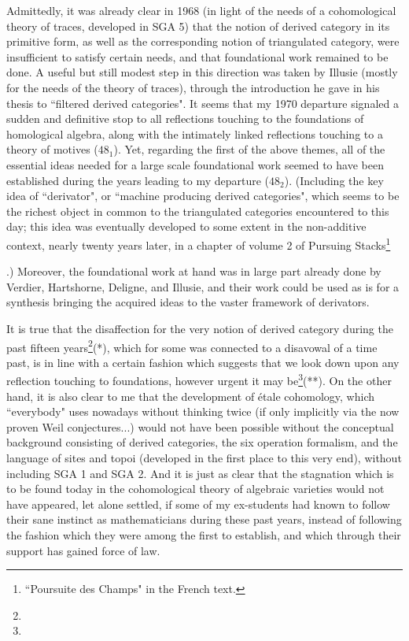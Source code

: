 Admittedly, it was already clear in 1968 (in light of the needs of a cohomological theory of traces, developed in SGA 5) that the notion of derived category in its primitive form, as well as the corresponding notion of triangulated category, were insufficient to satisfy certain needs, and that foundational work remained to be done. A useful but still modest step in this direction was taken by Illusie (mostly for the needs of the theory of traces), through the introduction he gave in his thesis to ``filtered derived categories". It seems that my 1970 departure signaled a sudden and definitive stop to all reflections touching to the foundations of homological algebra, along with the intimately linked reflections touching to a theory of motives ($48_1$).
Yet, regarding the first of the above themes, all of the essential ideas needed for a large scale foundational work seemed to have been established during the years leading to my departure ($48_2$).
(Including the key idea of ``derivator", or ``machine producing derived categories", which seems to be the richest object in common to the triangulated categories encountered to this day; this idea was eventually developed to some extent in the non-additive context, nearly twenty years later, in a chapter of volume 2 of Pursuing Stacks\footnote{``Poursuite des Champs" in the French text.}
\addtocounter{footnote}{-1}.) 
Moreover, the foundational work at hand was in large part already done by Verdier, Hartshorne, Deligne, and Illusie, and their work could be used as is for a synthesis bringing the acquired ideas to the vaster framework of derivators.

It is true that the disaffection for the very notion of derived category during the past fifteen years\footnote{}(*), which for some was connected to a disavowal of a time past, is in line with a certain fashion which suggests that we look down upon any reflection touching to foundations, however urgent it may be\footnote{}(**). On the other hand, it is also clear to me that the development of \'etale cohomology, which ``everybody" uses nowadays without thinking twice (if only implicitly via the now proven Weil conjectures...) would not have been possible without the conceptual background consisting of derived categories, the six operation formalism, and the language of sites and topoi (developed in the first place to this very end), without including SGA 1 and SGA 2. And it is just as clear that the stagnation which is to be found today in the cohomological theory of algebraic varieties would not have appeared, let alone settled, if some of my ex-students had known to follow their sane instinct as mathematicians during these past years, instead of following the fashion which they were among the first to establish, and which through their support has gained force of law. 

